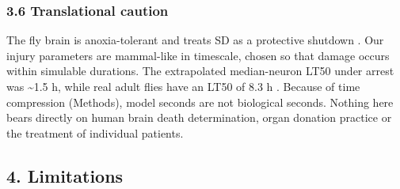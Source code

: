 \documentclass[11pt]{article}
\begin{document}
\subsubsection{3.6 Translational caution}\label{translational-caution}

The fly brain is anoxia-tolerant and treats SD as a protective shutdown \cite{robertson2020,campbell2018}. Our injury parameters are mammal-like in timescale, chosen so that damage occurs within simulable durations. The extrapolated median-neuron LT50 under arrest was \textasciitilde1.5 h, while real adult flies have an LT50 of 8.3 h \cite{callier2015}. Because of time compression (Methods), model seconds are not biological seconds. Nothing here bears directly on human brain death determination, organ donation practice or the treatment of individual patients.

\subsection{4. Limitations}\label{limitations}
\end{document}
